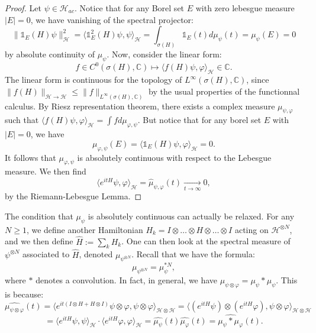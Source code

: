 \documentclass[a4paper]{article}
\theoremstyle{definition}
\begin{document}
\begin{proof}
Let $\psi \in \mathcal{H}_{ac}$. Notice that for any Borel set $E$ with zero lebesgue measure $|E|=0$, we have vanishing of the spectral projector:
$$ \|\mathbb{1}_E(H) \psi \|_{\mathcal{H}}^2 = \langle \mathbb{1}_E^2(H) \psi,\psi\rangle_{\mathcal{H}} = \int_{\sigma(H)} \mathbb{1}_E(t) d\mu_\psi(t) = \mu_\psi(E)=0 $$
by absolute continuity of $\mu_\psi$. Now, consider the linear form: 
$$ f \in C^0(\sigma(H),\mathbb{C}) \longmapsto \langle f(H) \psi,\varphi \rangle_{\mathcal{H}} \in \mathbb{C}.$$
The linear form is continuous for the topology of $L^\infty(\sigma(H),\mathbb{C})$, since $\|f(H)\|_{\mathcal{H} \rightarrow \mathcal{H}} \leq \|f\|_{L^\infty(\sigma(H),\mathbb{C})}$ by the usual properties of the functionnal calculus. By Riesz representation theorem, there exists a complex measure $\mu_{\psi,\varphi}$ such that $ \langle f(H) \psi,\varphi \rangle_{\mathcal{H}} = \int f d\mu_{\varphi,\psi}$. But notice that for any borel set $E$ with $|E|=0$, we have
$$ \mu_{\varphi,\psi}(E) = \langle \mathbb{1}_E(H) \psi,\varphi \rangle_{\mathcal{H}} = 0. $$
It follows that $\mu_{\varphi,\psi}$ is absolutely continuous with respect to the Lebesgue measure. We then find
$$ \langle e^{it H} \psi,\varphi \rangle_{\mathcal{H}} = \widehat{\mu}_{\psi,\varphi}(t) \underset{t\rightarrow \infty}{\longrightarrow} 0, $$
by the Riemann-Lebesgue Lemma.
\end{proof}

The condition that $\mu_\psi$ is absolutely continuous can actually be relaxed. For any $N \geq 1$, we define another Hamiltonian $H_k = I \otimes \dots \otimes H \otimes \dots \otimes I$ acting on $\mathcal{H}^{\otimes N}$, and we then define $\widehat{H} := \sum_k H_k$. One can then look at the spectral measure of $\psi^{\otimes N}$ associated to $\widehat{H}$, denoted $\mu_{\psi^{\otimes N}}$. Recall that we have the formula: $$ \mu_{\psi^{\otimes N}} = \mu_{\psi}^{* N} ,$$ where $*$ denotes a convolution. In fact, in general, we have $ \mu_{\psi \otimes \varphi} = \mu_\psi * \mu_\psi $. This is because:
$$ \widehat{\mu_{\psi \otimes \varphi}}(t) = \langle e^{i t (I \otimes H + H \otimes I)} \psi \otimes \varphi, \psi \otimes \varphi\rangle_{\mathcal{H} \otimes \mathcal{H}} =\langle  (e^{it H}\psi) \otimes (e^{it H}\varphi), \psi \otimes \varphi\rangle_{\mathcal{H} \otimes \mathcal{H}} $$ $$ = \langle e^{it H}\psi , \psi \rangle_\mathcal{H} \cdot \langle  e^{it H}\varphi , \varphi \rangle_{\mathcal{H}} = \widehat{\mu_\psi}(t) \widehat{\mu_\varphi}(t) = \widehat{\mu_\psi * \mu_\varphi }(t) .$$
\end{document}
